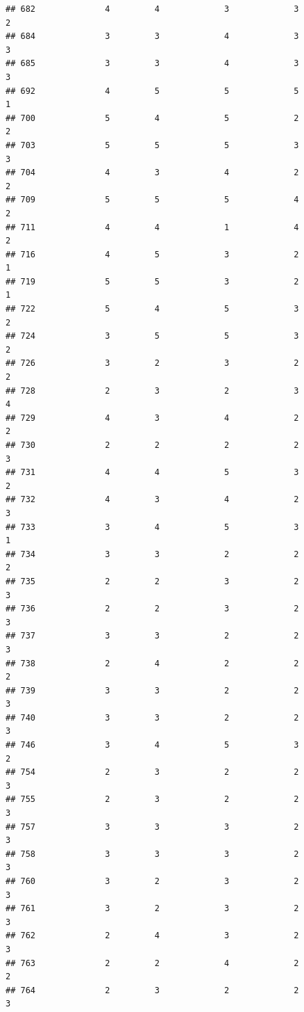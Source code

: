 \documentclass[
]{article}
\begin{document}
\begin{verbatim}
## 682              4         4             3             3           2
## 684              3         3             4             3           3
## 685              3         3             4             3           3
## 692              4         5             5             5           1
## 700              5         4             5             2           2
## 703              5         5             5             3           3
## 704              4         3             4             2           2
## 709              5         5             5             4           2
## 711              4         4             1             4           2
## 716              4         5             3             2           1
## 719              5         5             3             2           1
## 722              5         4             5             3           2
## 724              3         5             5             3           2
## 726              3         2             3             2           2
## 728              2         3             2             3           4
## 729              4         3             4             2           2
## 730              2         2             2             2           3
## 731              4         4             5             3           2
## 732              4         3             4             2           3
## 733              3         4             5             3           1
## 734              3         3             2             2           2
## 735              2         2             3             2           3
## 736              2         2             3             2           3
## 737              3         3             2             2           3
## 738              2         4             2             2           2
## 739              3         3             2             2           3
## 740              3         3             2             2           3
## 746              3         4             5             3           2
## 754              2         3             2             2           3
## 755              2         3             2             2           3
## 757              3         3             3             2           3
## 758              3         3             3             2           3
## 760              3         2             3             2           3
## 761              3         2             3             2           3
## 762              2         4             3             2           3
## 763              2         2             4             2           2
## 764              2         3             2             2           3

\end{verbatim}
\end{document}
